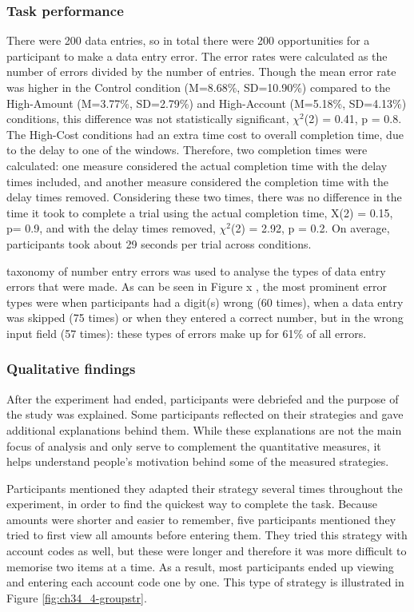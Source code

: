 \subsubsection{Task performance}
There were 200 data entries, so in total there were 200 opportunities for a participant to make a data entry error. The error rates were calculated as the number of errors divided by the number of entries. Though the mean error rate was higher in the Control condition (M=8.68\%, SD=10.90\%) compared to the High-Amount (M=3.77\%, SD=2.79\%) and High-Account (M=5.18\%, SD=4.13\%) conditions, this difference was not statistically significant, $\chi^2$(2) = 0.41, p = 0.8. 
The High-Cost conditions had an extra time cost to overall completion time, due to the delay to one of the windows. Therefore, two completion times were calculated: one measure considered the actual completion time with the delay times included, and another measure considered the completion time with the delay times removed. Considering these two times, there was no difference in the time it took to complete a trial using the actual completion time,  X(2) = 0.15, p= 0.9, and with the delay times removed,  $\chi^2$(2) = 2.92, p = 0.2. On average, participants took about 29 seconds per trial across conditions.

\citet{Wiseman2011} taxonomy of number entry errors was used to analyse the types of data entry errors that were made. As can be seen in Figure x , the most prominent error types were when participants had a digit(s) wrong (60 times), when a data entry was skipped (75 times) or when they entered a correct number, but in the wrong input field (57 times): these types of errors make up for 61\% of all errors.

\subsubsection{Qualitative findings}
After the experiment had ended, participants were debriefed and the purpose of the study was explained. Some participants reflected on their strategies and gave additional explanations behind them. While these explanations are not the main focus of analysis and only serve to complement the quantitative measures, it helps understand people's motivation behind some of the measured strategies.

Participants mentioned they adapted their strategy several times throughout the experiment, in order to find the quickest way to complete the task. Because amounts were shorter and easier to remember, five participants mentioned they tried to first view all amounts before entering them. They tried this strategy with account codes as well, but these were longer and therefore it was more difficult to memorise two items at a time. As a result, most participants ended up viewing and entering each account code one by one. This type of strategy is illustrated in Figure \ref{fig:ch34_4-groupstr}.

